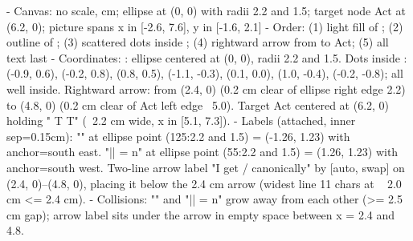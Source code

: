 \begin{proofWrapper}
\begin{content}
\begin{hidden}
- Canvas: no scale, cm; ellipse  at (0, 0) with radii 2.2 and 1.5; target node Act at (6.2, 0); picture spans x in [-2.6, 7.6], y in [-1.6, 2.1]
- Order: (1) light fill of ; (2) outline of ; (3) scattered dots inside ; (4) rightward arrow from  to Act; (5) all text last
- Coordinates:
  : ellipse centered at (0, 0), radii 2.2 and 1.5.
  Dots inside : (-0.9, 0.6), (-0.2, 0.8), (0.8, 0.5), (-1.1, -0.3), (0.1, 0.0), (1.0, -0.4), (-0.2, -0.8); all well inside.
  Rightward arrow: from (2.4, 0) (0.2 cm clear of ellipse right edge 2.2) to (4.8, 0) (0.2 cm clear of Act left edge ~5.0).
  Target Act centered at (6.2, 0) holding " \times T \to T" (~2.2 cm wide, x in [5.1, 7.3]).
- Labels (attached, inner sep=0.15cm):
  "" at ellipse point (125:2.2 and 1.5) = (-1.26, 1.23) with anchor=south east.
  "|| = n" at ellipse point (55:2.2 and 1.5) = (1.26, 1.23) with anchor=south west.
  Two-line arrow label "I get / canonically" by [auto, swap] on (2.4, 0)--(4.8, 0), placing it below the 2.4 cm arrow (widest line 11 chars at \small ~ 2.0 cm <= 2.4 cm).
- Collisions: "" and "|| = n" grow away from each other (>= 2.5 cm gap); arrow label sits under the arrow in empty space between x = 2.4 and 4.8.
\end{hidden}
\begin{center}
\end{center}


\end{content}
\end{proofWrapper}
